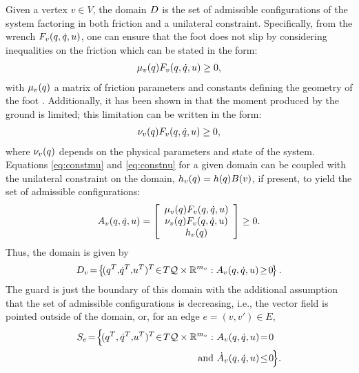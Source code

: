 Given a vertex $v \in V$, the domain $D$ is the set of admissible
configurations of the system factoring in both friction and a unilateral
constraint.
%
Specifically, from the wrench $F_{v}(q, \dot{q}, u)$, one can ensure that the foot
does not slip by considering inequalities on the friction which can be stated in
the form:
%
\begin{align}
  \label{eq:constmu}
  \mu_{v}(q) F_{v}(q, \dot{q}, u) \geq 0,
\end{align}
%
with $\mu_{v}(q)$ a matrix of friction parameters and constants defining the
geometry of the foot \cite{Grizzle2010}.
%
Additionally, it has been shown in \cite{Chevallereau2009, Vukobratovic1990}
that the moment produced by the ground is limited; this limitation can be
written in the form:
%
\begin{align}
  \label{eq:constnu}
  \nu_{v}(q) F_{v}(q, \dot{q}, u) \geq 0,
\end{align}
%
where $\nu_{v}(q)$ depends on the physical parameters and state of the
system.
%
Equations \eqref{eq:constmu} and \eqref{eq:constnu} for a given domain can be
coupled with the unilateral constraint on the domain, $h_{v}(q) = h(q)
B(v)$, if present, to yield the set of admissible configurations:
%
\begin{align}
  \label{admissible}
  A_{v}(q, \dot{q}, u) = \left[ \begin{array}{c}
      \mu_{v}(q) F_{v}(q, \dot{q}, u)\\
      \nu_{v}(q) F_{v}(q, \dot{q}, u)\\
      h_{v}(q)
    \end{array} \right] \geq 0.
\end{align}
%
Thus, the domain is given by
%
\begin{align}
  \label{eq:domain}
  \D_{v} \! = \! \left\{ \! (q^{T}, \! \dq^{T}, \! \uu^{T})^{T} \! \in \! T\Q
    \times \R^{m_{v}} : A_{v}\argsqdqu \! \geq \! 0 \! \right\}.
\end{align}
%
The guard is just the boundary of this domain with the additional assumption
that the set of admissible configurations is decreasing, i.e., the vector field
is pointed outside of the domain, or, for an edge $e = (v, v') \in E$,
%
\begin{align}
  S_{e} \! = \! \Bigl\{ \!(\q^{T}, \dq^{T}, \! \uu^{T})^{T} \! \in \! T\Q \times
  \R^{m_v} : \ &A_{v}\argsqdqu \! = \! 0 \\
  \nonumber
  \mathrm{and} \ &{\dot A}_{v}\argsqdqu \! \leq \! 0 \! \Bigl\}.
\end{align}

